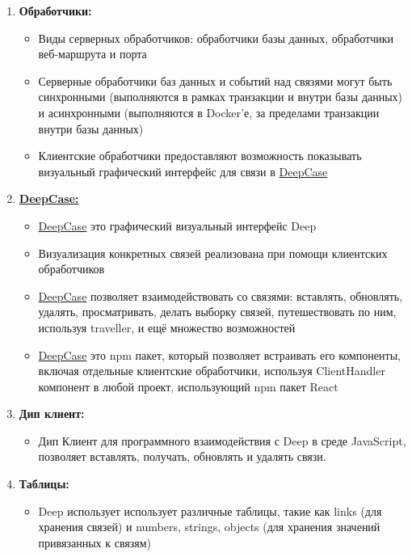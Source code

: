 \documentclass{article}
\begin{document}
\begin{enumerate}
  \item \textbf{Обработчики:}
        \begin{itemize}
          \item Виды серверных обработчиков: обработчики базы данных,
                обработчики веб-маршрута и порта
          \item Серверные обработчики баз данных и событий над связями могут
                быть синхронными (выполняются в рамках транзакции и внутри базы
                данных) и
                асинхронными (выполняются в Docker'е, за пределами транзакции
                внутри базы
                данных)
          \item Клиентские обработчики предоставляют возможность показывать
                визуальный графический интерфейс для связи в
                \hyperlink{DeepCase.Def}{DeepCase}
        \end{itemize}

  \item \textbf{\hyperlink{DeepCase.Def}{DeepCase:}}
        \begin{itemize}
          \item \hyperlink{DeepCase.Def}{DeepCase} это графический визуальный
                интерфейс Deep
          \item Визуализация конкретных связей реализована при помощи
                клиентских обработчиков
          \item \hyperlink{DeepCase.Def}{DeepCase} позволяет взаимодействовать
                со связями: вставлять,
                обновлять, удалять, просматривать, делать выборку связей,
                путешествовать по ним, используя traveller, и ещё множество
                возможностей
          \item \hyperlink{DeepCase.Def}{DeepCase} это npm пакет, который
                позволяет встраивать его
                компоненты, включая отдельные клиентские обработчики, используя
                ClientHandler
                компонент в любой проект, использующий npm пакет React
        \end{itemize}

  \item \textbf{Дип клиент:}
        \begin{itemize}
          \item Дип Клиент для программного взаимодействия с Deep в среде
                JavaScript, позволяет вставлять, получать, обновлять и удалять
                связи.
        \end{itemize}

  \item \textbf{Таблицы:}
        \begin{itemize}
          \item Deep использует использует различные таблицы, такие как links
                (для хранения связей) и numbers, strings, objects (для хранения
                значений
                привязанных к связям)
        \end{itemize}
\end{enumerate}
\end{document}
